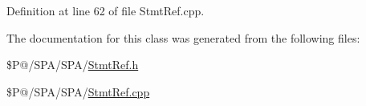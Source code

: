 Definition at line 62 of file Stmt\-Ref.\-cpp.



The documentation for this class was generated from the following files\-:\begin{DoxyCompactItemize}
\item 
\$\-P@/\-S\-P\-A/\-S\-P\-A/\hyperlink{_stmt_ref_8h}{Stmt\-Ref.\-h}\item 
\$\-P@/\-S\-P\-A/\-S\-P\-A/\hyperlink{_stmt_ref_8cpp}{Stmt\-Ref.\-cpp}\end{DoxyCompactItemize}
